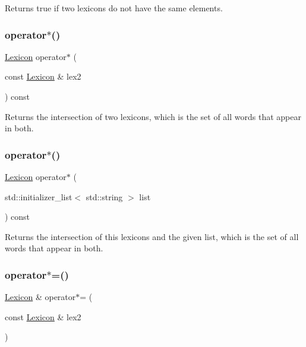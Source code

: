 Returns true if two lexicons do not have the same elements. 

\mbox{\label{classLexicon_a62286f0f5d7c1229b3003b855bf54ba3}} 
\subsubsection{\texorpdfstring{operator$\ast$()}{operator*()}\hspace{0.1cm}{\footnotesize\ttfamily [1/2]}}
{\footnotesize\ttfamily \mbox{\hyperlink{classLexicon}{Lexicon}} operator$\ast$ (\begin{DoxyParamCaption}\item[{const \mbox{\hyperlink{classLexicon}{Lexicon}} \&}]{lex2 }\end{DoxyParamCaption}) const}



Returns the intersection of two lexicons, which is the set of all words that appear in both. 

\mbox{\label{classLexicon_a5da3a8f0f6332bccefe7b2cb48d8a8d6}} 
\subsubsection{\texorpdfstring{operator$\ast$()}{operator*()}\hspace{0.1cm}{\footnotesize\ttfamily [2/2]}}
{\footnotesize\ttfamily \mbox{\hyperlink{classLexicon}{Lexicon}} operator$\ast$ (\begin{DoxyParamCaption}\item[{std\+::initializer\+\_\+list$<$ std\+::string $>$}]{list }\end{DoxyParamCaption}) const}



Returns the intersection of this lexicons and the given list, which is the set of all words that appear in both. 

\mbox{\label{classLexicon_ab81e3c0d6a5637202849784ef00b9cd5}} 
\subsubsection{\texorpdfstring{operator$\ast$=()}{operator*=()}\hspace{0.1cm}{\footnotesize\ttfamily [1/2]}}
{\footnotesize\ttfamily \mbox{\hyperlink{classLexicon}{Lexicon}} \& operator$\ast$= (\begin{DoxyParamCaption}\item[{const \mbox{\hyperlink{classLexicon}{Lexicon}} \&}]{lex2 }\end{DoxyParamCaption})}



